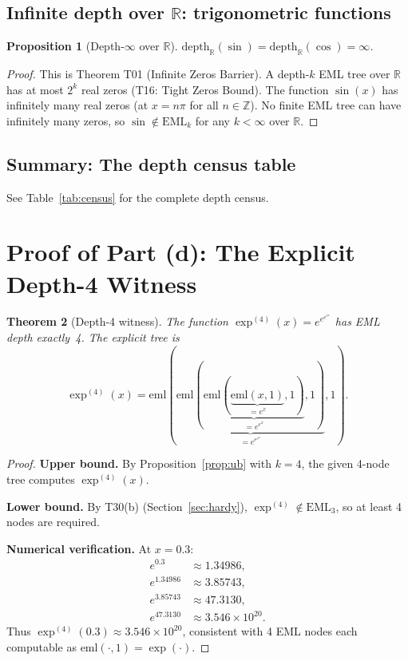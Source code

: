 \documentclass[12pt,a4paper]{article}
\newtheorem{theorem}{Theorem}[section]
\newtheorem{proposition}[theorem]{Proposition}
\theoremstyle{definition}
\theoremstyle{remark}
\begin{document}
\subsection{Infinite depth over $\mathbb{R}$: trigonometric functions}

\begin{proposition}[Depth-$\infty$ over $\mathbb{R}$]\label{prop:inf}
$\mathrm{depth}_\mathbb{R}(\sin)=\mathrm{depth}_\mathbb{R}(\cos)=\infty$.
\end{proposition}

\begin{proof}
This is Theorem T01 (Infinite Zeros Barrier).  A depth-$k$ EML tree over
$\mathbb{R}$ has at most $2^k$ real zeros (T16: Tight Zeros Bound).
The function $\sin(x)$ has infinitely many real zeros (at $x=n\pi$ for all
$n\in\mathbb{Z}$).  No finite EML tree can have infinitely many zeros, so
$\sin\notin\mathrm{EML}_k$ for any $k<\infty$ over $\mathbb{R}$.
\end{proof}

\subsection{Summary: The depth census table}

See Table~\ref{tab:census} for the complete depth census.

\section{Proof of Part (d): The Explicit Depth-4 Witness}

\begin{theorem}[Depth-4 witness]\label{thm:d4}
The function $\exp^{(4)}(x)=e^{e^{e^{e^x}}}$ has EML depth exactly~4.
The explicit tree is
\[
  \exp^{(4)}(x) =
  \mathrm{eml}(\underbrace{\mathrm{eml}(\underbrace{\mathrm{eml}(\underbrace{\mathrm{eml}(x,1)}_{=e^x},1)}_{=e^{e^x}},1)}_{=e^{e^{e^x}}},1).
\]
\end{theorem}

\begin{proof}
\textbf{Upper bound.}  By Proposition~\ref{prop:ub} with $k=4$, the given
4-node tree computes $\exp^{(4)}(x)$.

\textbf{Lower bound.}  By T30(b) (Section~\ref{sec:hardy}),
$\exp^{(4)}\notin\mathrm{EML}_3$, so at least 4 nodes are required.

\textbf{Numerical verification.}
At $x=0.3$:
\begin{align*}
  e^{0.3} &\approx 1.34986,\\
  e^{1.34986} &\approx 3.85743,\\
  e^{3.85743} &\approx 47.3130,\\
  e^{47.3130} &\approx 3.546\times 10^{20}.
\end{align*}
Thus $\exp^{(4)}(0.3)\approx 3.546\times 10^{20}$, consistent with 4 EML nodes
each computable as $\mathrm{eml}(\cdot,1)=\exp(\cdot)$.
\end{proof}
\end{document}
